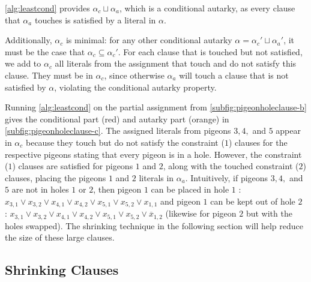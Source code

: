 \autoref{alg:leastcond} provides $\alpha_c \sqcup \alpha_a$, which is a conditional autarky, as every
clause that $\alpha_a$ touches is
satisfied by a literal in $\alpha$.

Additionally, $\alpha_c$ is minimal: for any other conditional autarky $\alpha =
\alpha_c' \sqcup \alpha_a'$, it must be the case that $\alpha_c \subseteq
\alpha_c'$. For each clause that is touched but not satisfied, we add to
$\alpha_c$ all literals from the assignment that touch and do not satisfy this
clause. They must be in $\alpha_c$, since otherwise $\alpha_a$ will touch a
clause that is not satisfied by $\alpha$, violating the conditional autarky
property.

Running \autoref{alg:leastcond} on the partial assignment from
\autoref{subfig:pigeonholeclause-b}  
gives the conditional part (red) and autarky part (orange) in
\autoref{subfig:pigeonholeclause-c}. The assigned literals from pigeons $3,4,$
and $5$ appear in $\alpha_c$ because they touch but do not satisfy the
constraint ($1$) clauses for the respective pigeons stating that every pigeon is
in a hole. However, the constraint ($1$) clauses are satisfied for pigeons $1$
and $2$, along with the touched constraint ($2$) clauses, placing the pigeons
$1$ and $2$ literals in $\alpha_a$. Intuitively, if pigeons $3,4,$ and $5$ are
not in holes $1$ or $2$, then pigeon $1$ can be placed in hole $1$ : $x_{3,1}
\lor x_{3,2} \lor x_{4,1} \lor x_{4,2} \lor x_{5,1} \lor x_{5,2} \lor x_{1,1} $
and pigeon $1$ can be kept out of hole $2$ : $x_{3,1} \lor x_{3,2} \lor x_{4,1}
\lor x_{4,2} \lor x_{5,1} \lor x_{5,2} \lor \overline{x}_{1,2} $ (likewise for
pigeon $2$ but with the holes swapped). 
The shrinking technique in the following section will help reduce the size of
these large \pr clauses. 



\subsection{Shrinking \pr Clauses}~\label{subsec:shrinking}

